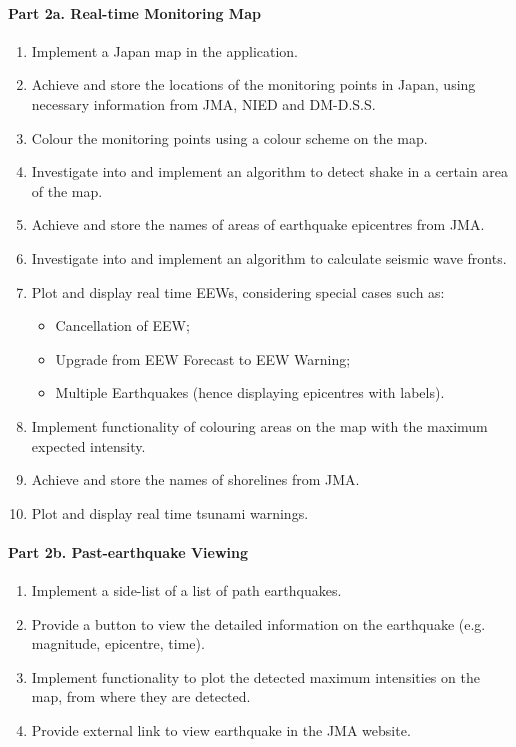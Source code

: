 \documentclass[10pt]{article}
\begin{document}
\paragraph{Part 2a. Real-time Monitoring Map}
\begin{enumerate}
    \item Implement a Japan map in the application.
    \item Achieve and store the locations of the monitoring points in Japan, using necessary information from JMA, NIED and DM-D.S.S.
    \item Colour the monitoring points using a colour scheme on the map.
    \item Investigate into and implement an algorithm to detect shake in a certain area of the map.
    \item Achieve and store the names of areas of earthquake epicentres from JMA.
    \item Investigate into and implement an algorithm to calculate seismic wave fronts.
    \item Plot and display real time EEWs, considering special cases such as:
          \begin{itemize}
              \item Cancellation of EEW;
              \item Upgrade from EEW Forecast to EEW Warning;
              \item Multiple Earthquakes (hence displaying epicentres with labels).
          \end{itemize}
    \item Implement functionality of colouring areas on the map with the maximum expected intensity.
    \item Achieve and store the names of shorelines from JMA.
    \item Plot and display real time tsunami warnings.
\end{enumerate}

\paragraph{Part 2b. Past-earthquake Viewing}
\begin{enumerate}
    \item Implement a side-list of a list of path earthquakes.
    \item Provide a button to view the detailed information on the earthquake (e.g. magnitude, epicentre, time).
    \item Implement functionality to plot the detected maximum intensities on the map, from where they are detected.
    \item Provide external link to view earthquake in the JMA website.
\end{enumerate}
\end{document}
